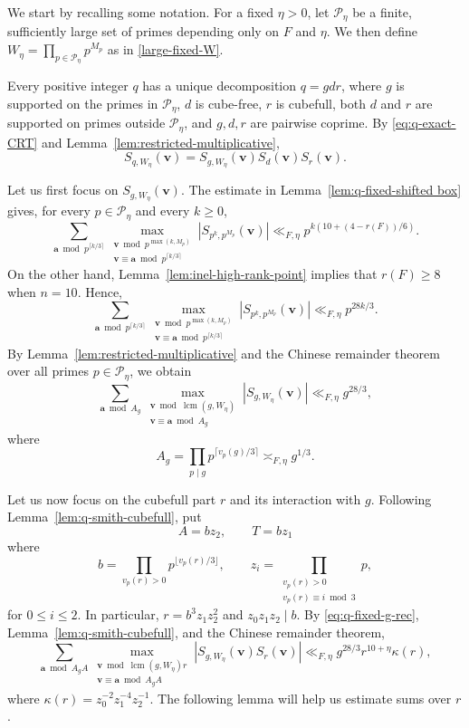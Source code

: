 \documentclass[a4paper,11pt, twoside,reqno]{amsart}
\theoremstyle{plain}
\theoremstyle{definition}
\theoremstyle{remark}
\newcommand{\bfa}{\bm{a}}
\newcommand{\bfv}{\bm{v}}
\renewcommand{\leq}{\leqslant}
\renewcommand{\geq}{\geqslant}
\newcommand{\lcm}{\operatorname{lcm}}
\numberwithin{equation}{section}
\begin{document}
We start by recalling some notation.
For a fixed $\eta>0$, let $\mathcal P_\eta$
be a finite, sufficiently large set of primes
depending only on $F$ and $\eta$.
We then define $W_\eta = \prod_{p\in \mathcal P_\eta} p^{M_p}$ as in \eqref{large-fixed-W}.

Every positive integer $q$ has a unique decomposition
$q=gdr$, where $g$ is supported on the primes in
$\mathcal P_\eta$, $d$ is cube-free, $r$ is cubefull,
both $d$ and $r$ are supported on primes outside $\mathcal P_\eta$,
and $g,d,r$ are pairwise coprime.
By 
\eqref{eq:q-exact-CRT} and 
Lemma~\ref{lem:restricted-multiplicative},
\[
S_{q,W_\eta}(\bfv)
=
S_{g,W_\eta}(\bfv)S_d(\bfv)S_r(\bfv).
\]

Let us first focus on $S_{g,W_\eta}(\bfv)$.
The estimate in Lemma~\ref{lem:q-fixed-shifted box} gives, for every
$p\in\mathcal P_\eta$ and every $k\geq0$,
\begin{equation*}
\sum_{\bfa\bmod{p^{\lceil k/3\rceil}}}
\max_{\substack{\bfv\bmod{p^{\max(k,M_p)}} \\ \bfv\equiv \bfa\bmod{p^{\lceil k/3\rceil}}}}
|S_{p^k,p^{M_p}}(\bfv)|
\ll_{F,\eta}
p^{k(10+(4-r(F))/6)}.
\end{equation*}
On the other hand,
Lemma~\ref{lem:inel-high-rank-point} implies that
$r(F)\geq8$ when $n=10$. Hence,
\begin{equation*}
\sum_{\bfa\bmod{p^{\lceil k/3\rceil}}}
\max_{\substack{\bfv\bmod{p^{\max(k,M_p)}} \\ \bfv\equiv \bfa\bmod{p^{\lceil k/3\rceil}}}}
|S_{p^k,p^{M_p}}(\bfv)|
\ll_{F,\eta}
p^{28k/3}.
\end{equation*}
By Lemma~\ref{lem:restricted-multiplicative} and the Chinese remainder theorem
over all primes $p\in \mathcal P_\eta$,
we obtain
\begin{equation}
\label{eq:q-fixed-g-rec}
\sum_{\bfa\bmod{A_g}}
\max_{\substack{\bfv\bmod{\lcm(g,W_\eta)} \\ \bfv\equiv \bfa\bmod{A_g}}}
|S_{g,W_\eta}(\bfv)|
\ll_{F,\eta}
g^{28/3},
\end{equation}
where
\[
A_g
=
\prod_{p\mid g}p^{\lceil v_p(g)/3\rceil}
\asymp_{F,\eta}g^{1/3}.
\]

Let us now focus on the cubefull part $r$ and its
interaction with $g$.
Following Lemma~\ref{lem:q-smith-cubefull}, put
\[
A=bz_2,\qquad T=bz_1
\]
where
\begin{equation}
\label{eq:q-buw-rec}
b = \prod_{v_p(r)>0}p^{\lfloor v_p(r)/3\rfloor},
\qquad
z_i =
\prod_{\substack{v_p(r)>0\\
v_p(r)\equiv i\bmod3}}p,
\end{equation}
for $0\leq i\leq2$. 
In particular, $r=b^3z_1z_2^2$ and $z_0z_1z_2\mid b$.
By \eqref{eq:q-fixed-g-rec},
Lemma~\ref{lem:q-smith-cubefull},
and the Chinese remainder theorem,
\begin{equation}
\label{eq:Pgr}
\sum_{\bfa\bmod{A_gA}}
\max_{\substack{\bfv\bmod{\lcm(g,W_\eta)r} \\ \bfv\equiv \bfa\bmod{A_gA}}}
|S_{g,W_\eta}(\bfv)S_r(\bfv)|
\ll_{F,\eta}
g^{28/3} r^{10+\eta}\kappa(r),
\end{equation}
where $\kappa(r)=z_0^{-2}z_1^{-4}z_2^{-1}$.
The following lemma will help us estimate sums over $r$.
\end{document}
